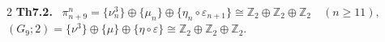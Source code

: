 \documentclass[10pt, leqno]{ltjsarticle}
\newcommand{\gen}[1]{\{#1\}}       %
\newcommand{\pit}[2]{\pi_{#1}^{#2}}
\numberwithin{equation}{section}
\theoremstyle{plain}
\theoremstyle{definition}
\theoremstyle{remark}
\begin{document}
\begin{paracol}{2}
\noindent
\textbf{Th7.2.}\
\(\pit{n+9}{n}=\gen{\nu_{n}^{3}}\oplus\gen{\mu_{n}}\oplus\gen{\eta_{n}\circ\varepsilon_{n+1}}
\cong\mathbb Z_{2}\oplus\mathbb Z_{2}\oplus\mathbb Z_{2}\quad (n\ge11),\)\\
\((G_{9};2)=\gen{\nu^{3}}\oplus\gen{\mu}\oplus\gen{\eta\circ\varepsilon}\cong\mathbb Z_{2}\oplus\mathbb Z_{2}\oplus\mathbb Z_{2}.\)




\end{paracol}
\end{document}
